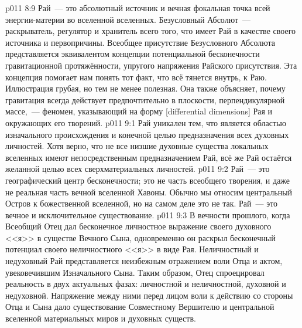 \vs p011 8:9 Рай~--- это абсолютный источник и вечная фокальная точка всей энергии\hyp{}материи во вселенной вселенных. Безусловный Абсолют~--- раскрыватель, регулятор и хранитель всего того, что имеет Рай в качестве своего источника и первопричины. Всеобщее присутствие Безусловного Абсолюта представляется эквивалентом концепции потенциальной бесконечности гравитационной протяжённости, упругого напряжения Райского присутствия. Эта концепция помогает нам понять тот факт, что всё тянется внутрь, к Раю. Иллюстрация грубая, но тем не менее полезная. Она также объясняет, почему гравитация всегда действует предпочтительно в плоскости, перпендикулярной массе,~--- феномен, указывающий на форму [differential dimensions] Рая и окружающих его творений.
\vs p011 9:1 Рай уникален тем, что является областью изначального происхождения и конечной целью предназначения всех духовных личностей. Хотя верно, что не все низшие духовные существа локальных вселенных имеют непосредственным предназначением Рай, всё же Рай остаётся желанной целью всех сверхматериальных личностей.
\vs p011 9:2 \pc Рай~--- это географический центр бесконечности; это не часть всеобщего творения, и даже не реальная часть вечной вселенной Хавоны. Обычно мы относим центральный Остров к божественной вселенной, но на самом деле это не так. Рай~--- это вечное и исключительное существование.
\vs p011 9:3 \pc В вечности прошлого, когда Всеобщий Отец дал бесконечное личностное выражение своего духовного <<я>> в существе Вечного Сына, одновременно он раскрыл бесконечный потенциал своего неличностного <<я>> в виде Рая. Неличностный и недуховный Рай представляется неизбежным отражением воли Отца и актом, увековечившим Изначального Сына. Таким образом, Отец спроецировал реальность в двух актуальных фазах: личностной и неличностной, духовной и недуховной. Напряжение между ними перед лицом воли к действию со стороны Отца и Сына дало существование Совместному Вершителю и центральной вселенной материальных миров и духовных существ.
